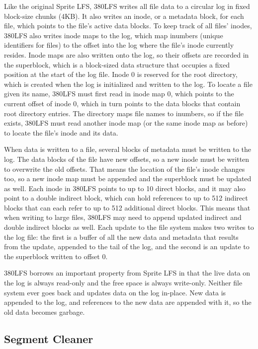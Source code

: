 \documentclass{article}
\begin{document}
Like the original Sprite LFS, 380LFS writes all file data to a circular log in fixed block-size chunks (4KB). It also writes an inode, or a metadata block, for each file, which points to the file’s active data blocks. To keep track of all files’ inodes, 380LFS also writes inode maps to the log, which map inumbers (unique identifiers for files) to the offset into the log where the file’s inode currently resides. Inode maps are also written onto the log, so their offsets are recorded in the superblock, which is a block-sized data structure that occupies a fixed position at the start of the log file. Inode 0 is reserved for the root directory, which is created when the log is initialized and written to the log. To locate a file given its name, 380LFS must first read in inode map 0, which points to the current offset of inode 0, which in turn points to the data blocks that contain root directory entries. The directory maps file names to inumbers, so if the file exists, 380LFS must read another inode map (or the same inode map as before) to locate the file’s inode and its data.

When data is written to a file, several blocks of metadata must be written to the log. The data blocks of the file have new offsets, so a new inode must be written to overwrite the old offsets. That means the location of the file’s inode changes too, so a new inode map must be appended and the superblock must be updated as well. Each inode in 380LFS points to up to 10 direct blocks, and it may also point to a double indirect block, which can hold references to up to 512 indirect blocks that can each refer to up to 512 additional direct blocks. This means that when writing to large files, 380LFS may need to append updated indirect and double indirect blocks as well. Each update to the file system makes two writes to the log file: the first is a buffer of all the new data and metadata that results from the update, appended to the tail of the log, and the second is an update to the superblock written to offset 0.

380LFS borrows an important property from Sprite LFS in that the live data on the log is always read-only and the free space is always write-only. Neither file system ever goes back and updates data on the log in-place. New data is appended to the log, and references to the new data are appended with it, so the old data becomes garbage.

\subsection{Segment Cleaner}
\end{document}
